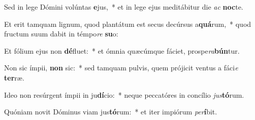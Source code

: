 \item Sed in lege Dómini volúntas \textbf{e}jus,~* et in lege ejus meditábitur die \textit{ac} \textbf{noc}te.
\item Et erit tamquam lignum, quod plantátum est secus decúrsus a\textbf{quá}rum,~* quod fructum suum dabit in témpo\textit{re} \textbf{su}o:
\item Et fólium ejus non \textbf{dé}fluet:~* et ómnia quæcúmque fáciet, prospe\textit{ra}\textbf{bún}tur.
\item Non sic ímpii, \textbf{non} sic:~* sed tamquam pulvis, quem prójicit ventus a fáci\textit{e} \textbf{ter}ræ.
\item Ideo non resúrgent ímpii in ju\textbf{dí}cio:~* neque peccatóres in concílio \textit{jus}\textbf{tó}rum.
\item Quóniam novit Dóminus viam jus\textbf{tó}rum:~* et iter impiórum \textit{per}\textbf{í}bit.
